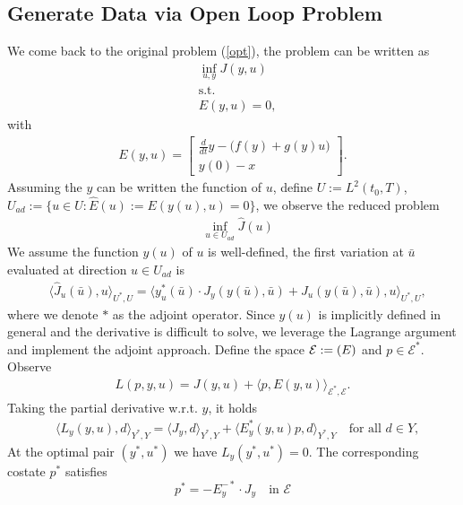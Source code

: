 \documentclass[12pt,fleqn]{amsart}
\theoremstyle{definition}
\let\ran\relax
\DeclareMathOperator{\ran}{ran}
\begin{document}
\subsection{Generate Data via Open Loop Problem}
We come back to the original problem (\ref{opt}), the problem can be written as 
\begin{align*}
	&  \inf_{u, y} J(y, u)\\
	& \text{s.t.}\\
	& E(y, u) = 0,
\end{align*} 
with 
\begin{align*}
	E(y, u) = 
	\begin{bmatrix}
		\frac{d}{dt} y - \bigg(f(y) + g(y) u \bigg)\\
		y(0) - x 
	\end{bmatrix}.
\end{align*}
Assuming the $y$ can be written the function of $u$, define $U:= L^2(t_0, T)$, $U_{ad}:= \{u \in U:  \hat{E}(u):= E(y(u), u) = 0 \}$,  we observe the reduced problem
\begin{align*}
	& \inf_{u \in U_{ad}} \hat{J}(u)
\end{align*}
We assume the function $y(u)$ of $u$ is well-defined, the first variation at $\bar{u}$ evaluated at direction $u \in U_{ad}$ is
\begin{align*}
	&\langle \hat{J}_u(\bar{u}), u \rangle_{U^*, U} = \langle y_u^*(\bar{u}) \cdot  J_y(y(\bar{u}), \bar{u}) + J_u(y(\bar{u}), \bar{u}), u \rangle_{U^*, U},
\end{align*}
where we denote $*$ as the adjoint operator. Since $y(u)$ is implicitly defined in general and the derivative is difficult to solve, we leverage the Lagrange argument and implement the adjoint approach. Define the space $\mathcal{E}: = \ran(E)$ and $p \in  \mathcal{E}^*$. Observe
\begin{align*}
	L(p, y, u) = J(y, u) + \langle p, E(y, u) \rangle_{\mathcal{E}^*, \mathcal{E}}.
\end{align*}
Taking the partial derivative w.r.t. $y$, it holds
\begin{align*}
	&  \langle L_y(y, u), d \rangle_{Y^*, Y} = \langle J_y, d \rangle_{Y^*, Y} +   \langle E_y^*(y, u) p, d \rangle_{Y^*, Y}  \quad \text{for all } d \in Y,
\end{align*}
At the optimal pair $(y^*, u^*)$ we have $L_y(y^*, u^*) = 0$. The corresponding costate $p^*$ satisfies
\begin{equation}
\label{adjoint equation}
 	 p^*  = - E^{-*}_y \cdot  J_y \quad \text{in } \mathcal{E} 
\end{equation}
\end{document}
